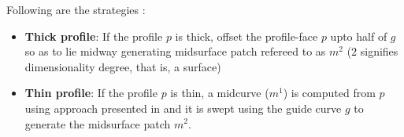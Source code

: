Following are the strategies :%
	\begin{itemize}[noitemsep,topsep=2pt,parsep=2pt,partopsep=2pt]
	\item\textbf{Thick profile}:  If the profile $p$ is thick, offset the profile-face $p$ upto half of $g$ so as to lie midway generating midsurface patch refereed to as $m^2$ ($2$ signifies dimensionality degree, that is, a surface)%
	\item \textbf{Thin profile}:  If the profile $p$ is thin, a midcurve ($m^1$) is computed from $p$ using approach presented in \cite{YogeshETES2014, YogeshIJCAET2017} and it  is swept using the guide curve $g$ to generate the midsurface patch $m^2$.%
	\end{itemize}
%


